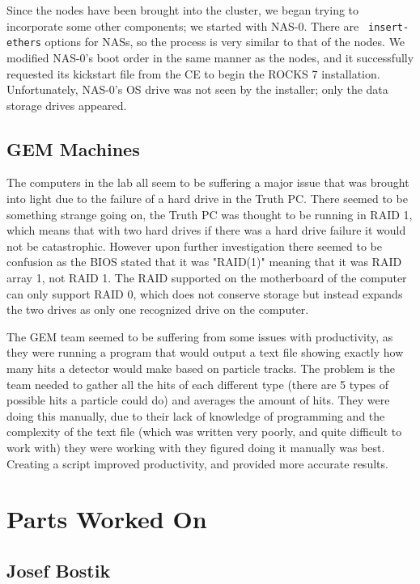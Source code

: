 \documentclass[12pt]{article}
\newcommand\tab[1][1cm]{\hspace*{#1}}
\begin{document}
\tab Since the nodes have been brought into the cluster, we began trying to
incorporate some other components; we started with NAS-0. There are {\tt
  insert-ethers} options for NASs, so the process is very similar to that of the
nodes. We modified NAS-0's boot order in the same manner as the nodes, and it
successfully requested its kickstart file from the CE to begin the ROCKS 7
installation. Unfortunately, NAS-0's OS drive was not seen by the installer;
only the data storage drives appeared. 

\subsection{GEM Machines}

\tab The computers in the lab all seem to be suffering a major issue that was
brought into light due to the failure of a hard drive in the Truth PC. There
seemed to be something strange going on, the Truth PC was thought to be running
in RAID 1, which means that with two hard drives if there was a hard drive failure it would not be catastrophic. However upon further investigation there
seemed to be confusion as the BIOS stated that it was "RAID(1)" meaning that it 
was RAID array 1, not RAID 1. The RAID supported on the motherboard of the 
computer can only support RAID 0, which does not conserve storage but instead
expands the two drives as only one recognized drive on the computer.

\tab The GEM team seemed to be suffering from some issues with productivity, as
they were running a program that would output a text file showing exactly how
many hits a detector would make based on particle tracks. The problem is the
team needed to gather all the hits of each different type (there are 5 types of
possible hits a particle could do) and averages the amount of hits. They were
doing this manually, due to their lack of knowledge of programming and the
complexity of the text file (which was written very poorly, and quite difficult
to work with) they were working with they figured doing it manually was best. 
Creating a script improved productivity, and provided more accurate results. 

\section{Parts Worked On}

\subsection{Josef Bostik}
\end{document}
